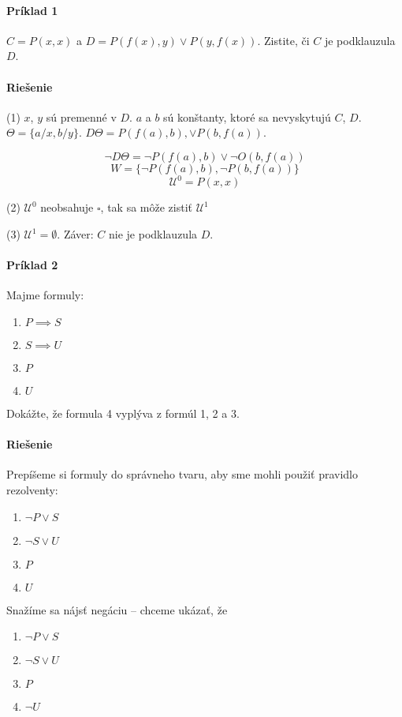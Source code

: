 \paragraph{Príklad 1} $C=P(x,x)$ a $D=P(f(x),y) \lor P(y,f(x))$. Zistite, či $C$
je podklauzula $D$.

\paragraph{Riešenie} (1) $x$, $y$ sú premenné v $D$. $a$ a $b$ sú konštanty,
ktoré sa nevyskytujú $C$, $D$. $\Theta = \{ a/x, b/y\}$. $D\Theta = P(f(a),b), \lor P(b,
f(a))$.

$$\neg D\Theta = \neg P(f(a),b) \lor \neg O(b,f(a))$$
$$W = \{ \neg P(f(a),b), \neg P(b,f(a))\}$$
$$\mathcal{U}^0 = P(x,x)$$


\par (2) $\mathcal{U}^0$ neobsahuje $\square$, tak sa môže zistiť
$\mathcal{U}^1$
\par (3) $\mathcal{U}^1 = \emptyset$. Záver: $C$ nie je podklauzula $D$.


\paragraph{Príklad 2} Majme formuly:

\begin{enumerate}
	\item $P\implies S$
	\item $S \implies U$
	\item $P$
	\item $U$
\end{enumerate}

Dokážte, že formula 4 vyplýva z formúl 1, 2 a 3. 

\paragraph{Riešenie} Prepíšeme si formuly do správneho tvaru, aby sme mohli
použiť pravidlo rezolventy:
\begin{enumerate}
	\item $\neg P \lor S$
	\item $\neg S\lor U$
	\item $P$
	\item $U$
\end{enumerate}
Snažíme sa nájsť negáciu -- chceme ukázať, že 
\begin{enumerate}
	\item $\neg P \lor S$
	\item $\neg S\lor U$
	\item $P$
	\item $\neg U$
\end{enumerate}

